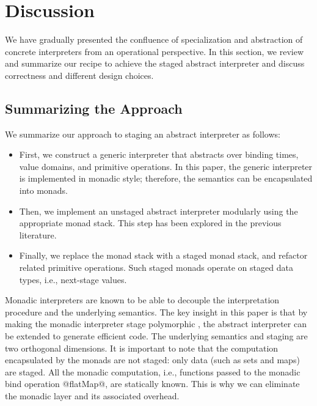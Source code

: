 \section{Discussion} \label{discussion}

We have gradually presented the confluence of specialization and abstraction of
concrete interpreters from an operational perspective.  In this section, we
review and summarize our recipe to achieve the staged abstract interpreter and
discuss correctness and different design choices.

\subsection{Summarizing the Approach}

We summarize our approach to staging an abstract interpreter as follows:

\begin{itemize}
  \item First, we construct a generic interpreter that abstracts over binding times,
    value domains, and primitive operations. In this paper, the generic interpreter
    is implemented in monadic style; therefore, the semantics can be encapsulated
    into monads.
  \item Then, we implement an unstaged abstract interpreter modularly using the
    appropriate monad stack. This step has been explored in the previous
    literature.
  \item Finally, we replace the monad stack with a staged monad stack, and
    refactor related primitive operations.  Such staged monads operate on
    staged data types, i.e., next-stage values.
\end{itemize}

Monadic interpreters are known to be able to decouple the interpretation
procedure and the underlying semantics. The key insight in this paper is that
by making the monadic interpreter stage polymorphic
\cite{Ofenbeck:2017:SGP:3136040.3136060, Amin:2017:CTI:3177123.3158140}, the
abstract interpreter can be extended to generate efficient code. The
underlying semantics and staging are two orthogonal dimensions. It is important
to note that the computation encapsulated by the monads are not staged: only
data (such as sets and maps) are staged. All the monadic computation, i.e.,
functions passed to the monadic bind operation @flatMap@, are statically known.
This is why we can eliminate the monadic layer and its associated overhead.

